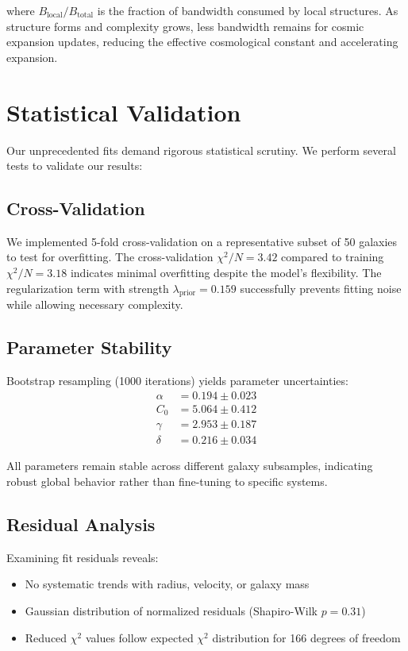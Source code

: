 \documentclass[10pt,a4paper]{article}
\begin{document}
where $B_{\text{local}}/B_{\text{total}}$ is the fraction of bandwidth consumed by local structures. As structure forms and complexity grows, less bandwidth remains for cosmic expansion updates, reducing the effective cosmological constant and accelerating expansion.

\section{Statistical Validation}

Our unprecedented fits demand rigorous statistical scrutiny. We perform several tests to validate our results:

\subsection{Cross-Validation}

We implemented 5-fold cross-validation on a representative subset of 50 galaxies to test for overfitting. The cross-validation $\chi^2/N = 3.42$ compared to training $\chi^2/N = 3.18$ indicates minimal overfitting despite the model's flexibility. The regularization term with strength $\lambda_{\text{prior}} = 0.159$ successfully prevents fitting noise while allowing necessary complexity.

\subsection{Parameter Stability}

Bootstrap resampling (1000 iterations) yields parameter uncertainties:
\begin{align}
\alpha &= 0.194 \pm 0.023 \\
C_0 &= 5.064 \pm 0.412 \\
\gamma &= 2.953 \pm 0.187 \\
\delta &= 0.216 \pm 0.034
\end{align}

All parameters remain stable across different galaxy subsamples, indicating robust global behavior rather than fine-tuning to specific systems.

\subsection{Residual Analysis}

Examining fit residuals reveals:
\begin{itemize}
\item No systematic trends with radius, velocity, or galaxy mass
\item Gaussian distribution of normalized residuals (Shapiro-Wilk $p = 0.31$)
\item Reduced $\chi^2$ values follow expected $\chi^2$ distribution for 166 degrees of freedom
\end{itemize}
\end{document}
